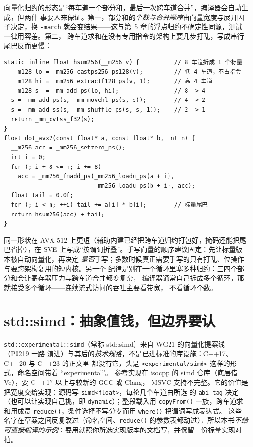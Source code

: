 \documentclass[12pt,a4paper,fontset=fandol]{ctexbook}
\newcommand{\cpp}[1]{C++#1}
\newcommand{\Fn}[1]{\texttt{#1()}}
\newcommand{\Tp}[1]{\texttt{#1}}
\begin{document}
向量化归约的形态是``每车道一个部分和，最后一次跨车道合并''，编译器会自动生成，但两件
事要人来保证。第一，部分和的\emph{个数与合并顺序}由向量宽度与展开因子决定，换
\Tp{-march} 就会变结果——这与第~5 章的浮点归约不确定性同源，测试一律用容差。第二，
跨车道求和在没有专用指令的架构上要几步打乱，写成串行尾巴反而更慢：
\begin{lstlisting}[style=cppstyle,caption={跨车道求和：先折半再相加，不要串行收尾}]
static inline float hsum256(__m256 v) {          // 8 车道折成 1 个标量
  __m128 lo = _mm256_castps256_ps128(v);         // 低 4 车道，不占指令
  __m128 hi = _mm256_extractf128_ps(v, 1);       // 高 4 车道
  __m128 s  = _mm_add_ps(lo, hi);                // 8 -> 4
  s = _mm_add_ps(s, _mm_movehl_ps(s, s));        // 4 -> 2
  s = _mm_add_ss(s, _mm_shuffle_ps(s, s, 1));    // 2 -> 1
  return _mm_cvtss_f32(s);
}
float dot_avx2(const float* a, const float* b, int n) {
  __m256 acc = _mm256_setzero_ps();
  int i = 0;
  for (; i + 8 <= n; i += 8)
    acc = _mm256_fmadd_ps(_mm256_loadu_ps(a + i),
                          _mm256_loadu_ps(b + i), acc);
  float tail = 0.0f;
  for (; i < n; ++i) tail += a[i] * b[i];        // 标量尾巴
  return hsum256(acc) + tail;
}
\end{lstlisting}
同一形状在 AVX-512 上更短（辅助内建已经把跨车道归约打包好，掩码还能把尾巴省掉），在
SVE 上写成``按谓词折叠''。手写向量的顺序建议固定：先让标量版本被自动向量化，再决定
\emph{是否}手写；多数时候真正需要手写的只有打乱、位操作与要跨架构复用的短内核。另一个
纪律是别在一个循环里塞多种归约：三四个部分和会让寄存器压力与跨车道合并都变复杂，
编译器通常自己拆成多个循环，那就接受多个循环——连续流式访问的吞吐主要看带宽，
不看循环个数。

\section{std::simd：抽象值钱，但边界要认}

\Tp{std::experimental::simd}（常称 std::simd）来自 WG21 的向量化提案线（P0219 一路
演进）与其后的\emph{技术规格}，不是已进标准的库设施：C++17、C++20 与 C++23 的正文里
都没有它，头是 \Tp{<experimental/simd>} 这样的形式，命名空间带着 ``experimental''。
参考实现在 isocpp 的 simd 仓库（底层借 Vc），要 \cpp{17} 以上与较新的 GCC 或 Clang，
MSVC 支持不完整。它的价值是把宽度交给实现：源码写 \Tp{simd<float>}，每轮几个车道由所选
的 \Tp{abi\_tag} 决定（也可以让实现自己挑，即 \Tp{dynamic}）；整段载入用 \Fn{copyFrom}
一族，跨车道求和用成员 \Fn{reduce}，条件选择不写分支而用 \Fn{where} 把谓词写成表达式。
这些名字在草案之间反复改过（命名空间、\Fn{reduce} 的参数表都动过），所以本书\emph{不给
可直接编译的示例}：要用就照你所选实现版本的文档写，并保留一份标量实现对拍。
\end{document}
